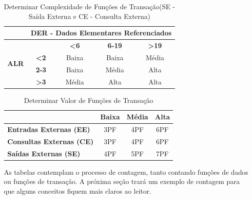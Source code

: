 \begin{table}[H]
\centering
\caption[Determinar Complexidade de Funções de Transação - SE, CE]{Determinar Complexidade de Funções de Transação(SE - Saída Externa  e CE - Consulta Externa)}
\label{funcoesdetransacao2}
\begin{tabular}{|c|c|c|c|c|}
\hline
                              & \multicolumn{4}{c|}{\textbf{DER - Dados Elementares Referenciados}}                    \\ \hline
\multirow{4}{*}{\textbf{ALR}} & \textbf{}              & \textbf{\textless6} & \textbf{6-19} & \textbf{\textgreater19} \\ \cline{2-5}
                              & \textbf{\textless2}    & Baixa               & Baixa         & Média                   \\ \cline{2-5}
                              & \textbf{2-3}           & Baixa               & Média         & Alta                    \\ \cline{2-5}
                              & \textbf{\textgreater3} & Média               & Alta          & Alta                    \\ \hline
\end{tabular}
\end{table}

\begin{table}[H]
\centering
\caption{Determinar Valor de Funções de Transação}
\label{my-label}
\begin{tabular}{|l|c|c|c|}
\hline
\textbf{}                                              & \multicolumn{1}{l|}{\textbf{Baixa}} & \multicolumn{1}{l|}{\textbf{Média}} & \multicolumn{1}{l|}{\textbf{Alta}} \\ \hline
\textbf{Entradas Externas (EE)}                        & 3PF                                 & 4PF                                 & 6PF                                \\ \hline
\multicolumn{1}{|c|}{\textbf{Consultas Externas (CE)}} & 3PF                                 & 4PF                                 & 6PF                                \\ \hline
\textbf{Saídas Externas (SE)}                          & 4PF                                 & 5PF                                 & 7PF                                \\ \hline
\end{tabular}
\end{table}

As tabelas contemplam o processo de contagem, tanto contando funções de dados ou funções de transação. A próxima seção trará um exemplo de contagem para que alguns conceitos fiquem mais claros ao leitor.

